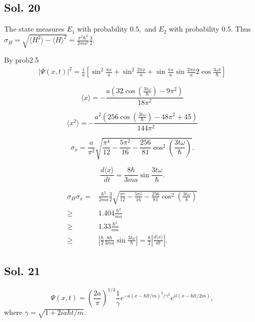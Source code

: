 \subsection*{Sol. 20}
The state measures $E_1$ with probability $0.5,$ and $E_2$ with probability $0.5.$
Thus $\sigma_H=\sqrt{\langle H^2\rangle - \langle H\rangle^2} = \frac{\pi^2\hbar^2}{2ma^2}\frac{3}{2}.$ 

By prob2.5
\begin{align*}
        |\Psi(x,t)|^2=\frac{1}{a}
        \left[
    \sin^2\frac{\pi x}{a}
    +\sin^2\frac{2\pi x}{a}
    +\sin\frac{\pi x}{a} \sin\frac{2\pi x}{a}
    2\cos\frac{3\omega t}{\hbar}
    \right]
\end{align*}

$$
\langle x\rangle
=-\frac{a \left(32 \cos\left(\frac{3t{\omega}}{\hbar}\right) - 9\pi^{2}\right)}{18\pi^{2}}
$$

$$
\langle x^2\rangle
=-\frac{a^{2} \left(256 \cos\left(\frac{3t{\omega}}{\hbar}\right) - 48\pi^{2} + 45\right)}{144\pi^{2}}
$$

$$\sigma_x=\frac{a}{\pi^2}\sqrt{\frac{\pi^4}{12}-\frac{5\pi^2}{16}-\frac{256}{81}\cos^2\left(\frac{3t\omega}{\hbar}\right)}.$$

$$\frac{d\langle x\rangle}{dt}=\frac{8\hbar}{3ma}\sin \frac{3t\omega}{\hbar}.$$

\begin{align*}
    \sigma_H\sigma_x=&
    \frac{\hbar^2}{2ma}\frac{3}{2}
    \sqrt{\frac{\pi^4}{12}-\frac{5\pi^2}{16}-\frac{256}{81}\cos^2\left(\frac{3t\omega}{\hbar}\right)}\\
    \geq &1.404\frac{\hbar^2}{ma}\\
    \geq & 1.33\frac{\hbar^2}{ma}
    \\
    \geq& 
    \left|\frac{\hbar}{2}\frac{8\hbar}{3ma}\sin \frac{3t\omega}{\hbar}\right|
    =\frac{\hbar}{2}\left|\frac{d\langle x\rangle}{dt}\right|.
\end{align*}

\subsection*{Sol. 21}

$$
\Psi(x,t)
=\left(\frac{2a}{\pi}\right)^{1/4}
\frac{1}{\gamma}
e^{-a(x-\hbar lt/m)^2/\gamma^2}
e^{il(x-\hbar lt/2m)},
$$
where $\gamma = \sqrt{1+2ia\hbar t/m}.$

